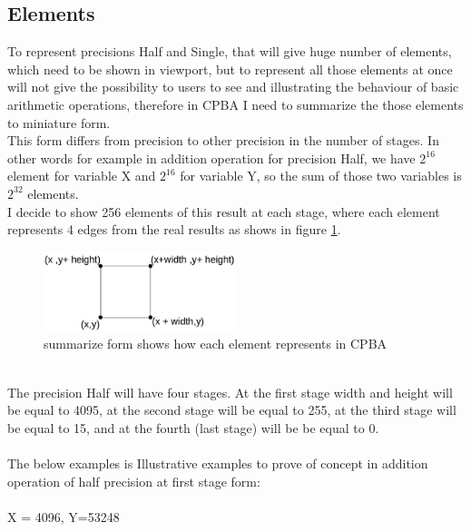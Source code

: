 \documentclass[11pt]{article}
\begin{document}
\subsection{Elements}
To represent precisions Half and Single, that will give huge number of elements, which need to be shown in viewport, but to represent all those elements at once will not give the possibility to users to see and illustrating the behaviour of basic arithmetic operations, therefore in CPBA I need to summarize the those elements to miniature form.\\
This form differs from precision to other precision in the number of stages. In other words for example in addition operation for precision Half, we have $2^{16}$ element for variable X and $2^{16}$ for variable Y, so the sum of those two variables is $2^{32}$ elements.\\
I decide to show 256 elements of this result at each stage, where each element represents 4 edges from the real results as shows in figure \ref{edges}.\\
\begin{figure}[h]
    \centering
    \includegraphics[width=0.5\textwidth]{edges}
    \caption{summarize form shows how each element represents in CPBA}
    \label{edges}
\end{figure}\\
The precision Half will have four stages. At the first stage width and height will be equal to 4095, at the second stage will be equal to 255, at the third stage will be equal to 15,  and at the fourth (last stage) will be be equal to 0.\\\\
The below examples is Illustrative examples to prove of concept in addition operation of half precision at first stage form:\\\\
X = 4096, Y=53248\\
\\\\
\end{document}
